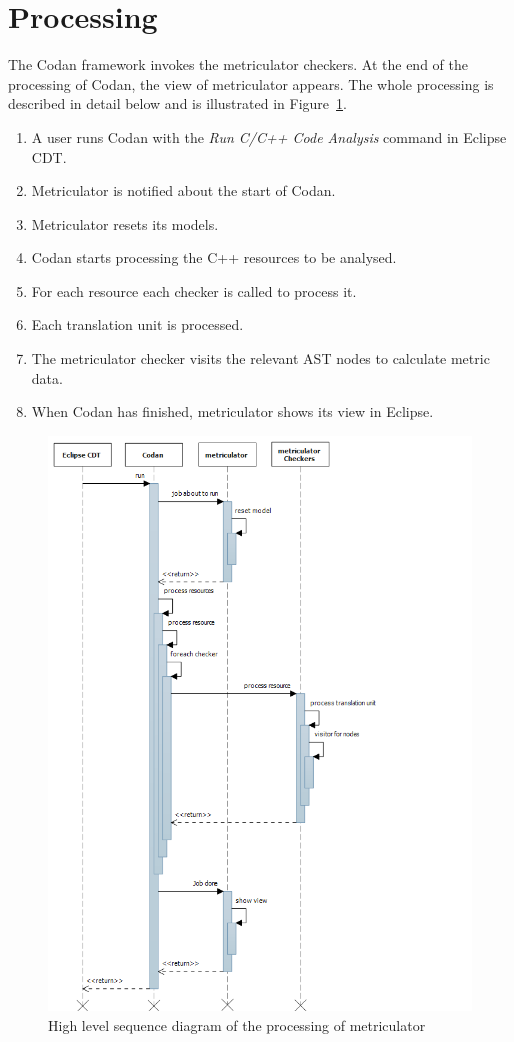 \documentclass[11pt,a4paper,oneside]{scrreprt}
\begin{document}
\section{Processing}\label{processing}
The Codan framework invokes the metriculator checkers. At the end of the processing of Codan, the view of metriculator appears. The whole processing is described in detail below and is illustrated in Figure~\ref{fig:processing}.
\begin{enumerate}
\item A user runs Codan with the \textit{Run C/C++ Code Analysis} command in Eclipse CDT.
\item Metriculator is notified about the start of Codan.
\item Metriculator resets its models.
\item Codan starts processing the C++ resources to be analysed.
\item For each resource each checker is called to process it.
\item Each translation unit is processed.
\item The metriculator checker visits the relevant AST nodes to calculate metric data.
\item When Codan has finished, metriculator shows its view in Eclipse.
\end{enumerate}
\begin{figure}[hp]
 \centering
  \includegraphics[width=\textwidth]{figures/processing.png}
 \caption{High level sequence diagram of the processing of metriculator}
  \label{fig:processing}
\end{figure}
\end{document}
